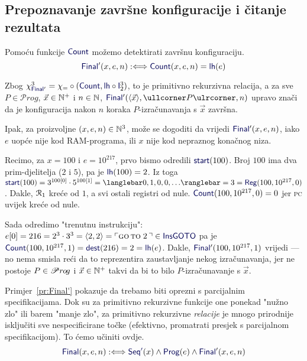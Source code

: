\subsection{Prepoznavanje završne konfiguracije i čitanje rezultata}

Pomoću funkcije $\f{Count}$ možemo detektirati završnu konfiguraciju.
\begin{equation}
    \f{Final}'(x,e,n):\Longleftrightarrow\f{Count}(x,e,n)\eq\f{lh}(e)
\end{equation}

Zbog $\chi_{\f{Final}'}^3=\chi_\eq\circ(\f{Count},\f{lh}\circ\f I_2^3)$, to je primitivno rekurzivna relacija, a za sve $P\in\mathscr Prog$, $\vec x\in{\mathbb N}^+$ i $n\in{\mathbb N}$, $\f{Final}'(\langle\vec x\rangle,\kprog P,n)$ upravo znači da je konfiguracija nakon $n$ koraka $P$-izračunavanja s $\vec x$ završna.

Ipak, za proizvoljne $(x,e,n)\in{\mathbb N}^3$, može se dogoditi da vrijedi $\f{Final}'(x,e,n)$, iako $e$ uopće nije kod RAM-programa, ili $x$ nije kod nepraznog konačnog niza.

\begin{primjer}[{name=[neintuitivnost parcijalno specificiranih relacija]}]\label{pr:Final'}
Recimo, za $x=100$ i $e=10^{217}$, prvo bismo odredili
$\f{start}(100)$. Broj $100$ ima dva prim-djelitelja ($2$ i $5$), pa je $\f{lh}(100)=2$. Iz toga $\f{start}(100)=3^{100[0]}\cdot5^{100[1]}=\knk{0,1,0,0,\dotsc}=3=\f{Reg}(100,10^{217},0)$. Dakle, $\mathcal R_{1}$ kreće od $1$, a svi ostali registri od nule.  $\f{Count}(100,10^{217},0)=0$ jer \textsc{pc} uvijek kreće od nule.

	Sada odredimo "trenutnu instrukciju": $e[0]=216=2^3\cdot3^3=\langle2,2\rangle=\kins{\goto\;2\,}\in\f{InsGOTO}$ pa je $\f{Count}(100,10^{217},1)=\f{dest}(216)=2=\f{lh}(e)$. Dakle, $\f{Final}'(100,10^{217},1)$ vrijedi --- no nema smisla reći da to reprezentira zaustavljanje nekog iz\-ra\-ču\-na\-va\-nja, jer ne postoje $P\in\mathscr Pr\mspace{-1mu}o\mspace{-2mu}g$ i $\vec x\in{\mathbb N}^+$ takvi da bi to bilo $P$-izračunavanje s $\vec x$.
\end{primjer}

Primjer~\ref{pr:Final'} pokazuje da trebamo biti oprezni s parcijalnim specifikacijama. Dok su za primitivno rekurzivne funkcije one ponekad "nužno zlo" ili barem "manje zlo", za primitivno rekurzivne \emph{relacije} je mnogo prirodnije isključiti sve nespecificirane točke (efektivno, promatrati presjek s parcijalnom specifikacijom). To ćemo učiniti ovdje.
\begin{equation}
\f{Final}(x,e,n):\Longleftrightarrow\f{Seq'}(x)\land\f{Prog}(e)\land\f{Final}'(x,e,n)
\end{equation}

